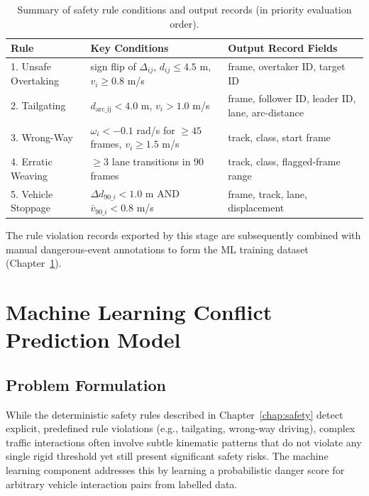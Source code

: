 \documentclass[12pt,a4paper]{report}
\begin{document}
\begin{table}[H]
\centering
\small
\caption{Summary of safety rule conditions and output records (in priority evaluation order).}
\label{tab:rule_params}
\begin{tabularx}{\textwidth}{l X X}
\toprule
\textbf{Rule} & \textbf{Key Conditions} & \textbf{Output Record Fields} \\
\midrule
1. Unsafe Overtaking & sign flip of $\Delta_{ij}$, $d_{ij} \le 4.5$ m, $v_i \ge 0.8$ m/s & frame, overtaker ID, target ID \\
2. Tailgating      & $d_{\text{arc\_ij}} < 4.0$ m, $v_i > 1.0$ m/s & frame, follower ID, leader ID, lane, arc-distance \\
3. Wrong-Way       & $\omega_i < -0.1$ rad/s for $\ge 45$ frames, $v_i \ge 1.5$ m/s & track, class, start frame \\
4. Erratic Weaving & $\ge 3$ lane transitions in 90 frames & track, class, flagged-frame range \\
5. Vehicle Stoppage & $\Delta d_{90\_i} < 1.0$ m AND $\bar{v}_{90\_i} < 0.8$ m/s & frame, track, lane, displacement \\
\bottomrule
\end{tabularx}
\end{table}

The rule violation records exported by this stage are subsequently combined with manual dangerous-event annotations to form the ML training dataset (Chapter~\ref{chap:ml}).
\clearpage\thispagestyle{empty}\newpage

\chapter{Machine Learning Conflict Prediction Model}
\label{chap:ml}

\section{Problem Formulation}

While the deterministic safety rules described in Chapter~\ref{chap:safety} detect explicit, predefined rule violations (e.g., tailgating, wrong-way driving), complex traffic interactions often involve subtle kinematic patterns that do not violate any single rigid threshold yet still present significant safety risks. The machine learning component addresses this by learning a probabilistic danger score for arbitrary vehicle interaction pairs from labelled data.
\end{document}
